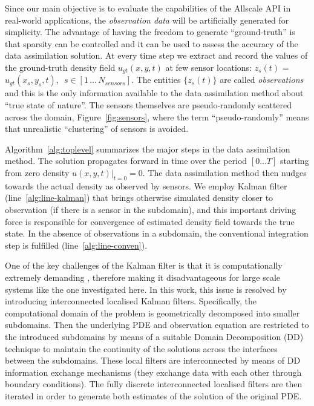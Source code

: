\documentclass[conference,compsoc]{IEEEtran}
\begin{document}
Since our main objective is to evaluate the capabilities of the Allscale API in real-world applications, the \textit{observation data} will be artificially generated for simplicity. The advantage of having the freedom to generate ``ground-truth'' is that sparsity can be controlled and it can be used to assess the accuracy of the data assimilation solution.  At every time step we extract and record the values of the ground-truth density field $u_{gt}(x,y,t)$ at few sensor locations: $z_s(t)$ = $u_{gt}(x_s,y_s,t)$, $\,\,s \in [1\,{\ldots}\,N_{sensors}]$. The entities $\{z_s(t)\}$ are called \textit{observations} and this is the only information available to the data assimilation method about ``true state of nature''. The sensors themselves are pseudo-randomly scattered across the domain, Figure~\ref{fig:sensors}, where the term ``pseudo-randomly'' means that unrealistic ``clustering'' of sensors is avoided. 

Algorithm~\ref{alg:toplevel} summarizes the major steps in the data assimilation method. The solution propagates forward in time over the period $[0 \ldots T]$ starting from zero density $u(x,y,t)\rvert_{t=0} = 0$. The data assimilation method then nudges towards the actual density as observed by sensors. We employ Kalman filter (line~\ref{alg:line-kalman}) that brings otherwise simulated density closer to observation (if there is a sensor in the subdomain), and this important driving force is responsible for convergence of estimated density field towards the true state. In the absence of observations in a subdomain, the conventional integration step is fulfilled (line~\ref{alg:line-conven}). 

One of the key challenges of the Kalman filter is that it is computationally extremely demanding  \cite{verhaegen1986numerical}, therefore  making it disadvantageous for large scale systems like the one investigated here.
In this work, this issue is resolved by introducing interconnected localised Kalman filters. Specifically, the computational domain of the problem is geometrically decomposed into smaller subdomains. Then the underlying PDE and observation equation are restricted to the introduced subdomains by means of a suitable Domain Decomposition (DD) technique to maintain the continuity of the solutions across the interfaces between the subdomains. These local filters are interconnected by means of DD information exchange mechanisms (they exchange data with each other through boundary conditions). The fully discrete interconnected localised filters are then iterated in order to generate both estimates of the solution of the original PDE.
\end{document}
